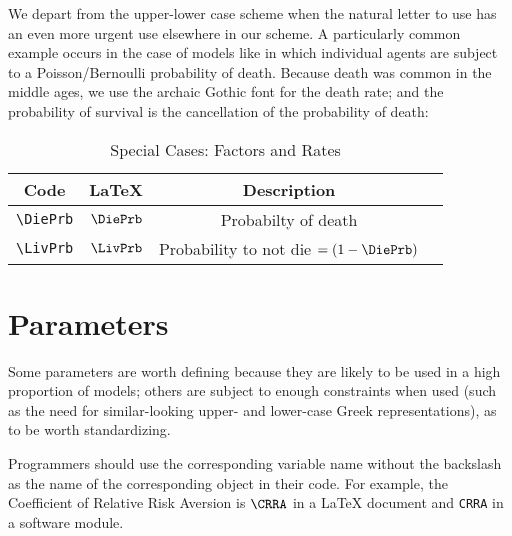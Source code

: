 \documentclass[12pt]{\econtex}
\begin{document}
We depart from the upper-lower case scheme when the natural letter to use has an even more urgent use elsewhere in our scheme.  A particularly common example occurs in the case of models like \cite{blanchardFinite} in which individual agents are subject to a Poisson/Bernoulli probability of death.  Because death was common in the middle ages, we use the archaic Gothic font for the death rate; and the probability of survival is the cancellation of the probability of death:
\begin{table}[ht]
  \centering
  \begin{tabular}{|>{\ttfamily}cccl|} 		
    \hline
    Code & \LaTeX & Description &  \\ 
    \hline
    \verb|\DiePrb|     & $\DiePrb$     & Probabilty of death & 
    \\ \verb|\LivPrb|     & $\LivPrb$     & Probability to not die $=(1-\DiePrb)$ & 
    \\	\hline
  \end{tabular}
  \caption{Special Cases: Factors and Rates}
  \label{table:SpecialFactors}
\end{table}	

\section{Parameters}
Some parameters are worth defining because they are likely to be
used in a high proportion of models; others are subject to enough
constraints when used (such as the need for similar-looking upper-
and lower-case Greek representations), as to be worth standardizing.

Programmers should 
use the corresponding variable name without the backslash as the name of the corresponding object 
in their code.  For example, the Coefficient of Relative Risk Aversion is $\verb|\CRRA|$ in a \LaTeX 
document and \texttt{CRRA} in a software module.
\end{document}
